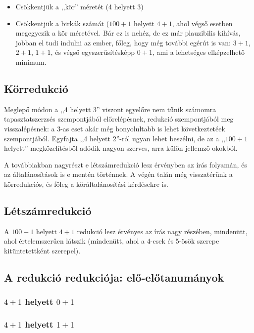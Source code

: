 \documentclass{article}
\begin{document}
	\begin{itemize}
		\item Csökkentjük a ,,kör'' méretét (4 helyett 3)
		\item Csökkentjük a birkák számát ($100 + 1$ helyett $4 +1$, ahol végső esetben megegyezik a kör méretével. Bár ez is nehéz, de ez már plauzibilis kihívás, jobban el tudi indulni az ember, főleg, hogy még további egérút is van: $3 +1$, $2 + 1$, $1 + 1$, és végső egyszerűsítésképp $0 + 1$, ami a lehetséges elképzelhető minimum.
	\end{itemize}

	\subsection{Körredukció}


	Meglepő módon a ,,4 helyett 3'' viszont egyelőre nem tűnik számomra tapasztatszerzsés szempontjából  előrelépésnek, redukció szempontjából meg  visszalépésnek: a 3-as eset akár még bonyolultabb is lehet következtetéek szempontjából. Egyfajta ,,4 helyett 2''-ról ugyan lehet beszélni, de az a ,,$100 + 1$ helyett'' megközelítésből adódik nagyon szerves, arra külön jellemző okokból.

	A továbbiakban nagyrészt e létszámredukció lesz érvényben az írás folyamán, és az általánosítások is e mentén történnek.
	A végén talán még visszatérünk a körredukciós, és főleg a köráltalánosítási kérdésekre is.

	\subsection{Létszámredukció}

	A $100 + 1$ helyett $4 + 1$ redukció lesz érvényes az írás nagy részében, mindenütt, ahol értelemszerűen látszik (mindenütt, ahol a 4-esek és 5-ösök szerepe kitüntetettként szerepel).

	\subsection{A redukció redukciója: elő-előtanumányok}

	\subsubsection{$4 + 1$ helyett $0 +1$}
	\subsubsection{$4 + 1$ helyett $1 +1$}
\end{document}

